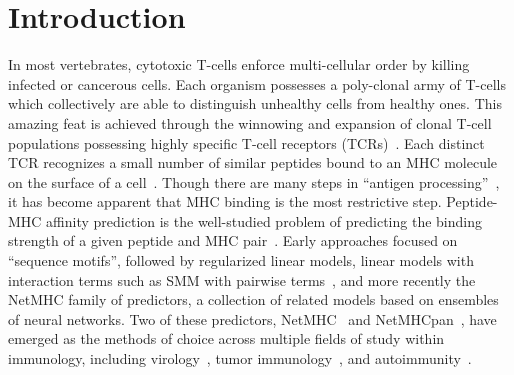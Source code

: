\section{Introduction}

In most vertebrates, cytotoxic T-cells enforce multi-cellular order by killing infected or cancerous cells. Each organism possesses a poly-clonal army of T-cells which collectively are able to distinguish unhealthy cells from healthy ones. This amazing feat is achieved through the winnowing and expansion of clonal T-cell populations possessing highly specific T-cell receptors (TCRs)~\cite{Blackman_1990}. Each distinct TCR recognizes a small number of similar peptides bound to an MHC molecule on the surface of a cell~\cite{Huseby_2005}. Though there are many steps in ``antigen processing''~\cite{Cresswell_2005}, it has become apparent that MHC binding is the most restrictive step. Peptide-MHC affinity prediction is the well-studied problem of predicting the binding strength of a given peptide and MHC pair~\cite{Lundegaard_2007}. Early approaches focused on ``sequence motifs''\cite{Sette_1989}, followed by regularized linear models, linear models with interaction terms such as SMM with pairwise terms~\cite{Peters_2003}, and more recently the NetMHC family of predictors, a collection of related models based on ensembles of neural networks. Two of these predictors, NetMHC~\cite{Lundegaard_2008} and NetMHCpan~\cite{Nielsen_2007}, have emerged as the methods of choice across multiple fields of study within immunology, including virology~\cite{Lund_2011}, tumor immunology~\cite{Gubin_2015}, and autoimmunity~\cite{Abreu_2012}. 


